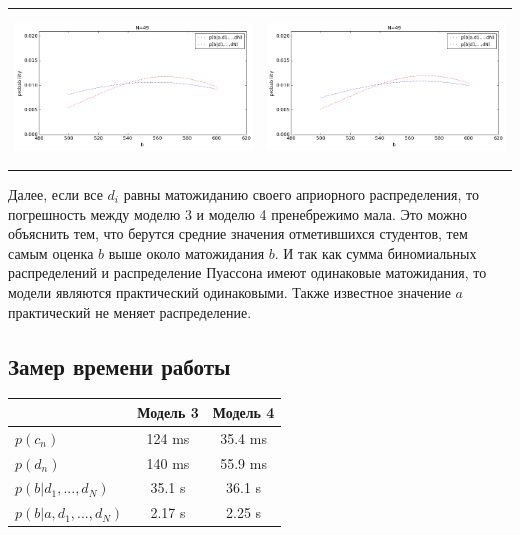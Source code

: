 \documentclass[12pt, a4paper]{article}
\begin{document}
\begin{center}
\begin{tabular}{ c  c }
                \includegraphics[width=8cm, height=4cm]{graphs/m3_ex_n49.png} &
                \includegraphics[width=8cm, height=4cm]{graphs/m4_ex_n49.png} \\
			\end{tabular}
			\end{center}
			
			Далее, если все $d_i$ равны матожиданию своего априорного распределения, то погрешность между моделю 3 и моделю 4 пренебрежимо мала. Это можно объяснить тем, что берутся средние значения отметившихся студентов, тем самым оценка $b$ выше около матожидания $b$. И так как сумма биномиальных распределений и распределение Пуассона имеют одинаковые матожидания, то модели являются практический одинаковыми. Также известное значение $a$ практический не меняет распределение.
			
		
		\newpage
		\subsection{Замер времени работы}
		\begin{center}
		\begin{tabular}{| l | c | c |}
			\hline
			& Модель 3 & Модель 4 \\
			\hline
			$p(c_n)$ & 124 ms & 35.4 ms \\
			\hline
			$p(d_n)$ & 140 ms & 55.9 ms \\
			\hline
			$p(b|d_1, ..., d_N)$ & 35.1 s & 36.1 s \\
			\hline
			$p(b|a, d_1, ..., d_N)$ & 2.17 s & 2.25 s \\
			\hline
		\end{tabular}
		\end{center}
	
\end{document}
